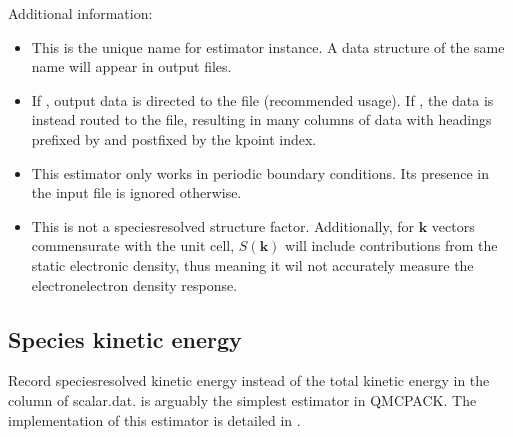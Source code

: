 \documentclass[letterpaper,10pt,english]{sphinxmanual}
\begin{document}
Additional information:
\begin{itemize}
\item {} 
 This is the unique name for estimator instance. A data
structure of the same name will appear in  output files.

\item {} 
 If , output data is directed to the
 file (recommended usage). If , the data is
instead routed to the  file, resulting in many columns
of data with headings prefixed by  and postfixed by the
k\sphinxhyphen{}point index.

\item {} 
This estimator only works in periodic boundary conditions. Its
presence in the input file is ignored otherwise.

\item {} 
This is not a species\sphinxhyphen{}resolved structure factor. Additionally, for
\(\mathbf{k}\) vectors commensurate with the unit cell,
\(S(\mathbf{k})\) will include contributions from the static
electronic density, thus meaning it wil not accurately measure the
electron\sphinxhyphen{}electron density response.

\end{itemize}
\def\sphinxLiteralBlockLabel{\label{\detokenize{hamiltonianobservable:listing-30}}}
\begin{sphinxVerbatim}[commandchars=\\\{\}]
       
\end{sphinxVerbatim}


\subsection{Species kinetic energy}
\label{\detokenize{hamiltonianobservable:species-kinetic-energy}}
Record species\sphinxhyphen{}resolved kinetic energy instead of the total kinetic
energy in the  column of scalar.dat. 
is arguably the simplest estimator in QMCPACK. The implementation of
this estimator is detailed in
.
\end{document}
